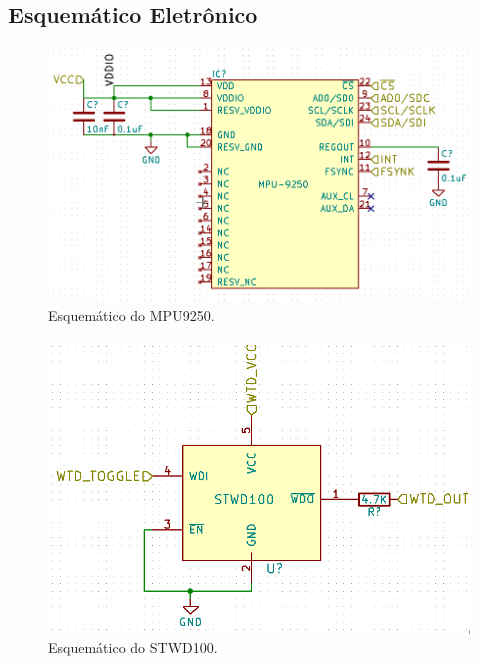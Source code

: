 \begin{apendicesenv}
\chapter{Esquemático Eletrônico}
\label{apendicee}


\begin{figure}[!h]
\centerfloat
	\centering
\includegraphics[keepaspectratio=true,scale=0.5]{figuras/mpu9250_esquema.PNG}
	\caption{Esquemático do MPU9250.}
	\label{apendMPU}
\end{figure}

\begin{figure}[!h]
\centerfloat
	\centering
\includegraphics[keepaspectratio=true,scale=0.5]{figuras/wtd_esquema.PNG}
	\caption{Esquemático do STWD100.}
	\label{STWD}
\end{figure}

\end{apendicesenv}
